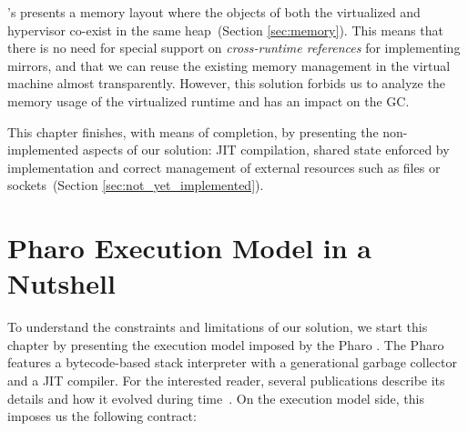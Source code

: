 \Vtt's presents a memory layout where the objects of both the virtualized and hypervisor co-exist in the same heap~(Section \ref{sec:memory}). This means that there is no need for special support on \emph{cross-runtime references} for implementing \eg mirrors, and that we can reuse the existing memory management in the virtual machine almost transparently.
However, this solution forbids us to analyze the memory usage of the virtualized runtime and has an impact on the GC.

This chapter finishes, with means of completion, by presenting the non-implemented aspects of our solution: JIT compilation, shared state enforced by \VM implementation and correct management of external resources such as files or sockets~(Section \ref{sec:not_yet_implemented}).

\section{Pharo Execution Model in a Nutshell}\label{sec:pharo_execution_model}

To understand the constraints and limitations of our solution, we start this chapter by presenting the execution model imposed by the Pharo \VM. The Pharo \VM features a bytecode-based stack interpreter with a generational garbage collector and a JIT compiler. For the interested reader, several publications describe its details and how it evolved during time~\cite{Gold83a,Inga97a,Mira11a}. On the execution model side, this \VM imposes us the following contract:

